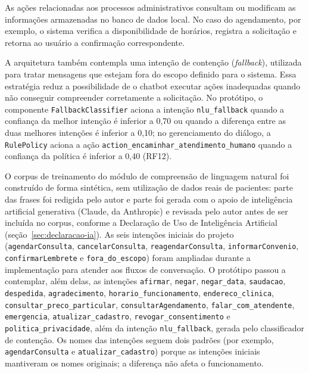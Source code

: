 \documentclass[12pt,a4paper]{extarticle}
\begin{document}
As ações relacionadas aos processos administrativos consultam ou modificam as informações armazenadas no banco de dados local. No caso do agendamento, por exemplo, o sistema verifica a disponibilidade de horários, registra a solicitação e retorna ao usuário a confirmação correspondente.

A arquitetura também contempla uma intenção de contenção (\textit{fallback}), utilizada para tratar mensagens que estejam fora do escopo definido para o sistema. Essa estratégia reduz a possibilidade de o chatbot executar ações inadequadas quando não conseguir compreender corretamente a solicitação. No protótipo, o componente \texttt{FallbackClassifier} aciona a intenção \texttt{nlu\_\allowbreak{}fallback} quando a confiança da melhor intenção é inferior a 0,70 ou quando a diferença entre as duas melhores intenções é inferior a 0,10; no gerenciamento do diálogo, a \texttt{RulePolicy} aciona a ação \texttt{action\_\allowbreak{}encaminhar\_\allowbreak{}atendimento\_\allowbreak{}humano} quando a confiança da política é inferior a 0,40 (RF12).

O corpus de treinamento do módulo de compreensão de linguagem natural foi construído de forma sintética, sem utilização de dados reais de pacientes: parte das frases foi redigida pelo autor e parte foi gerada com o apoio de inteligência artificial generativa (Claude, da Anthropic) e revisada pelo autor antes de ser incluída no corpus, conforme a Declaração de Uso de Inteligência Artificial (seção~\ref{sec:declaracao-ia}). As seis intenções iniciais do projeto (\texttt{agendarConsulta}, \texttt{cancelarConsulta}, \texttt{reagendarConsulta}, \texttt{informarConvenio}, \texttt{confirmarLembrete} e \texttt{fora\_\allowbreak{}do\_\allowbreak{}escopo}) foram ampliadas durante a implementação para atender aos fluxos de conversação. O protótipo passou a contemplar, além delas, as intenções \texttt{afirmar}, \texttt{negar}, \texttt{negar\_\allowbreak{}data}, \texttt{saudacao}, \texttt{despedida}, \texttt{agradecimento}, \texttt{horario\_\allowbreak{}funcionamento}, \texttt{endereco\_\allowbreak{}clinica}, \texttt{consultar\_\allowbreak{}preco\_\allowbreak{}particular}, \texttt{consultarAgendamento}, \texttt{falar\_\allowbreak{}com\_\allowbreak{}atendente}, \texttt{emergencia}, \texttt{atualizar\_\allowbreak{}cadastro}, \texttt{revogar\_\allowbreak{}consentimento} e \texttt{politica\_\allowbreak{}privacidade}, além da intenção \texttt{nlu\_\allowbreak{}fallback}, gerada pelo classificador de contenção. Os nomes das intenções seguem dois padrões (por exemplo, \texttt{agendarConsulta} e \texttt{atualizar\_\allowbreak{}cadastro}) porque as intenções iniciais mantiveram os nomes originais; a diferença não afeta o funcionamento.
\end{document}
